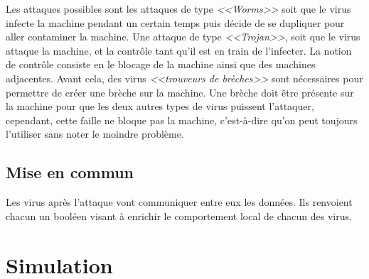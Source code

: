 \documentclass[francais, 10pt]{article}
\begin{document}
Les attaques possibles sont les attaques de type {\em <<Worms>>} soit que le virus infecte la machine pendant un certain temps puis décide de se dupliquer pour aller contaminer la machine. Une attaque de type {\em <<Trojan>>}, soit que le virus attaque la machine, et la contrôle tant qu'il est en train de l'infecter. La notion de contrôle consiste en le blocage de la machine ainsi que des machines adjacentes. Avant cela, des virus {\em<<trouveurs de brèches>>} sont nécessaires pour permettre de créer une brèche sur la machine. Une brèche doit être présente sur la machine pour que les deux autres types de virus puissent l'attaquer, cependant, cette faille ne bloque pas la machine, c'est-à-dire qu'on peut toujours l'utiliser sans noter le moindre problème.

\subsection{Mise en commun}
Les virus après l'attaque vont communiquer entre eux les données. Ils renvoient chacun un booléen visant à enrichir le comportement local de chacun des virus.

\section{Simulation}
\end{document}
